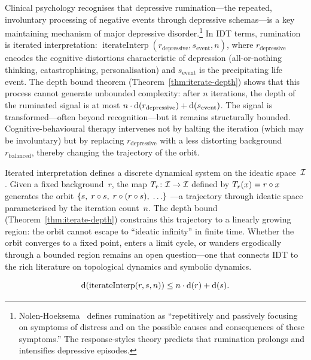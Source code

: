 \begin{example}
Clinical psychology recognises that depressive rumination---the repeated,
involuntary processing of negative events through depressive
schemas---is a key maintaining mechanism of major depressive disorder.\footnote{
Nolen-Hoeksema~\cite{nolen-hoeksema1991} defines rumination as
``repetitively and passively focusing on symptoms of distress and on the
possible causes and consequences of these symptoms.''  The
response-styles theory predicts that rumination prolongs and intensifies
depressive episodes.}  In IDT terms, rumination is iterated
interpretation: $\operatorname{iterateInterp}(r_{\mathrm{depressive}},
s_{\mathrm{event}}, n)$, where $r_{\mathrm{depressive}}$ encodes the
cognitive distortions characteristic of depression (all-or-nothing
thinking, catastrophising, personalisation) and $s_{\mathrm{event}}$ is
the precipitating life event.  The depth bound theorem
(Theorem~\ref{thm:iterate-depth}) shows that this process cannot
generate unbounded complexity: after $n$ iterations, the depth of the
ruminated signal is at most
$n \cdot \operatorname{d}(r_{\mathrm{depressive}}) + \operatorname{d}(s_{\mathrm{event}})$.
The signal is transformed---often beyond recognition---but it remains
structurally bounded.  Cognitive-behavioural therapy intervenes not by
halting the iteration (which may be involuntary) but by replacing
$r_{\mathrm{depressive}}$ with a less distorting background
$r_{\mathrm{balanced}}$, thereby changing the trajectory of the orbit.
\end{example}

\begin{remark}
Iterated interpretation defines a discrete dynamical system on the
ideatic space~$\mathcal{I}$.  Given a fixed background~$r$, the map
$T_r \colon \mathcal{I} \to \mathcal{I}$ defined by $T_r(x) = r \circ x$ generates
the orbit $\{s,\; r \circ s,\; r \circ (r \circ s),\; \ldots\}$
---a trajectory through ideatic space parameterised by the iteration
count~$n$.  The depth bound (Theorem~\ref{thm:iterate-depth}) constrains
this trajectory to a linearly growing region: the orbit cannot escape to
``ideatic infinity'' in finite time.  Whether the orbit converges to a
fixed point, enters a limit cycle, or wanders ergodically through a
bounded region remains an open question---one that connects IDT to the
rich literature on topological dynamics and symbolic dynamics.
\end{remark}

\begin{theorem}
\label{thm:iterate-depth}
\[
  \operatorname{d}(\operatorname{iterateInterp}(r, s, n))
  \leq n \cdot \operatorname{d}(r) + \operatorname{d}(s).
\]
\end{theorem}


